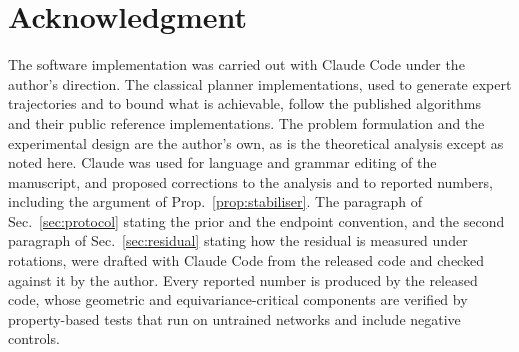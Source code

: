 \documentclass[conference]{IEEEtran}
\begin{document}
\section*{Acknowledgment}

The software implementation was carried out with Claude Code under the
author's direction. The classical planner implementations, used to
generate expert trajectories and to bound what is achievable, follow the
published
algorithms~\cite{kuffner2000rrtconnect,schulman2014trajopt,zucker2013chomp}
and their public reference implementations. The problem formulation and the
experimental design are the author's own, as is the theoretical analysis
except as noted here.
Claude was used for language and grammar editing of the manuscript, and
proposed corrections to the analysis and to reported numbers, including the
argument of Prop.~\ref{prop:stabiliser}. The paragraph of
Sec.~\ref{sec:protocol} stating the prior and the endpoint convention, and
the second paragraph of Sec.~\ref{sec:residual} stating how the residual is
measured under rotations, were drafted with Claude Code from the released
code and checked against it by the author.
Every reported number is produced by the released code, whose geometric
and equivariance-critical components are verified by property-based tests
that run on untrained networks and include negative controls.
\end{document}
